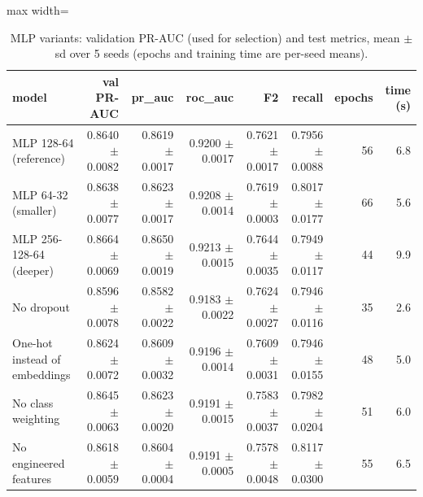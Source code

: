 \begin{table}[H]
\centering
\scriptsize
\begin{adjustbox}{max width=\linewidth}
\begin{tabular}{lrrrrrrr}
\toprule
model & val PR-AUC & pr\_auc & roc\_auc & F2 & recall & epochs & time (s) \\
\midrule
MLP 128-64 (reference) & 0.8640 $\pm$ 0.0082 & 0.8619 $\pm$ 0.0017 & 0.9200 $\pm$ 0.0017 & 0.7621 $\pm$ 0.0017 & 0.7956 $\pm$ 0.0088 & 56 & 6.8 \\
MLP 64-32 (smaller) & 0.8638 $\pm$ 0.0077 & 0.8623 $\pm$ 0.0017 & 0.9208 $\pm$ 0.0014 & 0.7619 $\pm$ 0.0003 & 0.8017 $\pm$ 0.0177 & 66 & 5.6 \\
MLP 256-128-64 (deeper) & 0.8664 $\pm$ 0.0069 & 0.8650 $\pm$ 0.0019 & 0.9213 $\pm$ 0.0015 & 0.7644 $\pm$ 0.0035 & 0.7949 $\pm$ 0.0117 & 44 & 9.9 \\
No dropout & 0.8596 $\pm$ 0.0078 & 0.8582 $\pm$ 0.0022 & 0.9183 $\pm$ 0.0022 & 0.7624 $\pm$ 0.0027 & 0.7946 $\pm$ 0.0116 & 35 & 2.6 \\
One-hot instead of embeddings & 0.8624 $\pm$ 0.0072 & 0.8609 $\pm$ 0.0032 & 0.9196 $\pm$ 0.0014 & 0.7609 $\pm$ 0.0031 & 0.7946 $\pm$ 0.0155 & 48 & 5.0 \\
No class weighting & 0.8645 $\pm$ 0.0063 & 0.8623 $\pm$ 0.0020 & 0.9191 $\pm$ 0.0015 & 0.7583 $\pm$ 0.0037 & 0.7982 $\pm$ 0.0204 & 51 & 6.0 \\
No engineered features & 0.8618 $\pm$ 0.0059 & 0.8604 $\pm$ 0.0004 & 0.9191 $\pm$ 0.0005 & 0.7578 $\pm$ 0.0048 & 0.8117 $\pm$ 0.0300 & 55 & 6.5 \\
\bottomrule
\end{tabular}
\end{adjustbox}
\caption{MLP variants: validation PR-AUC (used for selection) and test metrics, mean $\pm$ sd over 5 seeds (epochs and training time are per-seed means).}
\label{tab:mlp}
\end{table}
